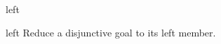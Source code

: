 \begin{tactic}{left}
  \begin{tsyntax}[empty]{left}
  Reduce a disjunctive goal to its left member.
  \end{tsyntax}
\end{tactic}

